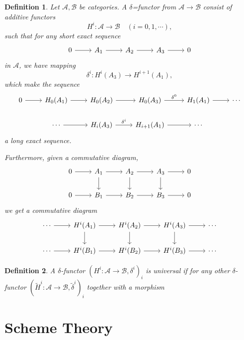 \documentclass{article}
\newtheorem{definition}{Definition}[section]
\numberwithin{equation}{section}
\begin{document}
\begin{definition}
Let $\mathcal{A},\mathcal{B}$ be categories. A $\delta$=functor from $\mathcal{A}\to\mathcal{B}$ consist of additive functors
\begin{equation*}
H^i:\mathcal{A}\to\mathcal{B}\quad (i=0,1,\cdots),
\end{equation*}
such that for any short exact sequence
\[
\begin{tikzcd}
0\arrow[r]&A_1\arrow[r]&A_2\arrow[r]&A_3\arrow[r]&0
\end{tikzcd}
\]
in $\mathcal{A}$, we have mapping
\begin{equation*}
\delta^i:H^i(A_3)\to H^{i+1}(A_1),
\end{equation*}
which make the sequence
\[
\begin{tikzcd}
0 \arrow[r] & H_0(A_1) \arrow[r] & H_0(A_2) \arrow[r]             & H_0(A_3) \arrow[r, "\delta^0"] & H_1(A_1) \arrow[r] & \cdots \\
            & \cdots \arrow[r]   & H_i(A_3) \arrow[r, "\delta^i"] & H_{i+1}(A_1) \arrow[r]         & \cdots             &       
\end{tikzcd}
\]
a long exact sequence.\\
\par Furthermore, given a commutative diagram,
\[
\begin{tikzcd}
0 \arrow[r] & A_1 \arrow[r] \arrow[d] & A_2 \arrow[r] \arrow[d] & A_3 \arrow[r] \arrow[d] & 0 \\
0 \arrow[r] & B_1 \arrow[r]           & B_2 \arrow[r]           & B_3 \arrow[r]           & 0
\end{tikzcd}
\]
we get a commutative diagram
\[
\begin{tikzcd}
\cdots \arrow[r] & H^i(A_1) \arrow[r] \arrow[d] & H^i(A_2) \arrow[r] \arrow[d] & H^i(A_3) \arrow[r] \arrow[d] & \cdots \\
\cdots \arrow[r] & H^i(B_1) \arrow[r]           & H^i(B_2) \arrow[r]           & H^i(B_3) \arrow[r]           & \cdots
\end{tikzcd}
\]
\end{definition}

\begin{definition}
A $\delta$-functor $(H^i:\mathcal{A}\to\mathcal{B},\delta^i)_i$ is universal if for any other $\delta$-functor $(\tilde{H}^i:\mathcal{A}\to\mathcal{B},\tilde{\delta}^i)_i$ together with a morphism 
\end{definition}

\section{Scheme Theory}
\end{document}
